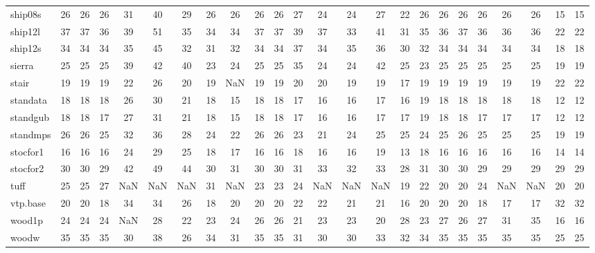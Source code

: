 \begin{longtable}{lccccccccccccccccccccccc}
ship08s & 26 & 26 & 26 & 31 & 40 & 29 & 26 & 26 & 26 & 26 & 27 & 24 & 24 & 27 & 22 & 26 & 26 & 26 & 26 & 26 & 26 & 15 & 15 \\
ship12l & 37 & 37 & 36 & 39 & 51 & 35 & 34 & 34 & 37 & 37 & 39 & 37 & 33 & 41 & 31 & 35 & 36 & 37 & 36 & 36 & 36 & 22 & 22 \\
ship12s & 34 & 34 & 34 & 35 & 45 & 32 & 31 & 32 & 34 & 34 & 37 & 34 & 35 & 36 & 30 & 32 & 34 & 34 & 34 & 34 & 34 & 18 & 18 \\
sierra & 25 & 25 & 25 & 39 & 42 & 40 & 23 & 24 & 25 & 25 & 35 & 24 & 24 & 42 & 25 & 23 & 25 & 25 & 25 & 25 & 25 & 19 & 19 \\
stair & 19 & 19 & 19 & 22 & 26 & 20 & 19 & NaN & 19 & 19 & 20 & 20 & 19 & 19 & 17 & 19 & 19 & 19 & 19 & 19 & 19 & 22 & 22 \\
standata & 18 & 18 & 18 & 26 & 30 & 21 & 18 & 15 & 18 & 18 & 17 & 16 & 16 & 17 & 16 & 19 & 18 & 18 & 18 & 18 & 18 & 12 & 12 \\
standgub & 18 & 18 & 17 & 27 & 31 & 21 & 18 & 15 & 18 & 18 & 17 & 16 & 16 & 17 & 17 & 19 & 18 & 18 & 17 & 17 & 17 & 12 & 12 \\
standmps & 26 & 26 & 25 & 32 & 36 & 28 & 24 & 22 & 26 & 26 & 23 & 21 & 24 & 25 & 25 & 24 & 25 & 26 & 25 & 25 & 25 & 19 & 19 \\
stocfor1 & 16 & 16 & 16 & 24 & 29 & 25 & 18 & 17 & 16 & 16 & 18 & 16 & 16 & 19 & 13 & 18 & 16 & 16 & 16 & 16 & 16 & 14 & 14 \\
stocfor2 & 30 & 30 & 29 & 42 & 49 & 44 & 30 & 31 & 30 & 30 & 31 & 33 & 32 & 33 & 28 & 31 & 30 & 30 & 29 & 29 & 29 & 29 & 29 \\
tuff & 25 & 25 & 27 & NaN & NaN & NaN & 31 & NaN & 23 & 23 & 24 & NaN & NaN & NaN & 19 & 22 & 20 & 20 & 24 & NaN & NaN & 20 & 20 \\
vtp.base & 20 & 20 & 18 & 34 & 34 & 26 & 18 & 20 & 20 & 20 & 22 & 22 & 21 & 21 & 16 & 20 & 20 & 20 & 18 & 17 & 17 & 32 & 32 \\
wood1p & 24 & 24 & 24 & NaN & 28 & 22 & 23 & 24 & 26 & 26 & 21 & 23 & 23 & 20 & 28 & 23 & 27 & 26 & 27 & 31 & 35 & 16 & 16 \\
woodw & 35 & 35 & 35 & 30 & 38 & 26 & 34 & 31 & 35 & 35 & 31 & 30 & 30 & 33 & 32 & 34 & 35 & 35 & 35 & 35 & 35 & 25 & 25 \\
\end{longtable}
